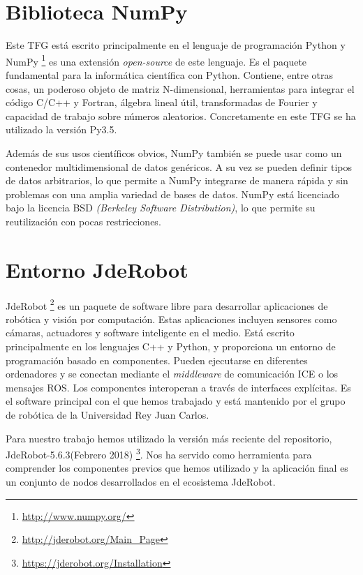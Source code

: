 \section{Biblioteca NumPy}
\hspace{1cm} Este TFG está escrito principalmente en el lenguaje de programación Python y NumPy \footnote{\url{http://www.numpy.org/}} es una extensión \textit{open-source} de este lenguaje. Es el paquete fundamental para la informática científica con Python. Contiene, entre otras cosas, un poderoso objeto de matriz N-dimensional, herramientas para integrar el código C/C++ y Fortran, álgebra lineal útil, transformadas de Fourier y capacidad de trabajo sobre números aleatorios. Concretamente en este TFG se ha utilizado la versión Py3.5.

\hspace{1cm} Además de sus usos científicos obvios, NumPy también se puede usar como un contenedor multidimensional de datos genéricos. A su vez se pueden definir tipos de datos arbitrarios, lo que permite a NumPy integrarse de manera rápida y sin problemas con una amplia variedad de bases de datos. NumPy está licenciado bajo la licencia BSD \textit{(Berkeley Software Distribution)}, lo que permite su reutilización con pocas restricciones.

\section{Entorno JdeRobot}
\hspace{1cm} JdeRobot \footnote{\url{http://jderobot.org/Main_Page}} es un paquete de software libre para desarrollar aplicaciones de robótica y visión por computación. Estas aplicaciones incluyen sensores como cámaras, actuadores y software inteligente en el medio. Está escrito principalmente en los lenguajes C++ y Python, y proporciona un entorno de programación basado en componentes. Pueden ejecutarse en diferentes ordenadores y se conectan mediante el \textit{middleware} de comunicación ICE o los mensajes ROS. Los componentes interoperan a través de interfaces explícitas. Es el software principal con el que hemos trabajado y está mantenido por el grupo de robótica de la Universidad Rey Juan Carlos.

\hspace{1cm} Para nuestro trabajo hemos utilizado la versión más reciente del repositorio, JdeRobot-5.6.3(Febrero 2018) \footnote{\url{https://jderobot.org/Installation}}. Nos ha servido como herramienta para comprender los componentes previos que hemos utilizado y la aplicación final es un conjunto de nodos desarrollados en el ecosistema JdeRobot.

